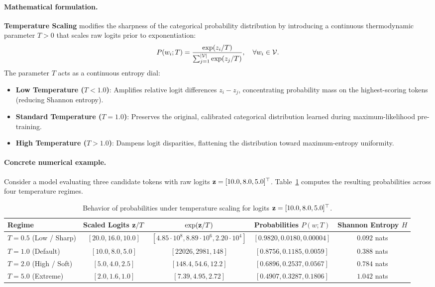 \documentclass[../../main.tex]{subfiles}
\begin{document}
\paragraph{Mathematical formulation.}
\textbf{Temperature Scaling} modifies the sharpness of the categorical probability distribution by introducing a continuous thermodynamic parameter $T > 0$ that scales raw logits prior to exponentiation:
\begin{equation}
\label{eq:temperature_softmax}
P(w_i; T) = \frac{\exp(z_i / T)}{\sum_{j=1}^{|\mathcal{V}|} \exp(z_j / T)}, \quad \forall w_i \in \mathcal{V}.
\end{equation}
The parameter $T$ acts as a continuous entropy dial:
\begin{itemize}
    \item \textbf{Low Temperature ($T < 1.0$)}: Amplifies relative logit differences $z_i - z_j$, concentrating probability mass on the highest-scoring tokens (reducing Shannon entropy).
    \item \textbf{Standard Temperature ($T = 1.0$)}: Preserves the original, calibrated categorical distribution learned during maximum-likelihood pre-training.
    \item \textbf{High Temperature ($T > 1.0$)}: Dampens logit disparities, flattening the distribution toward maximum-entropy uniformity.
\end{itemize}

\paragraph{Concrete numerical example.}
Consider a model evaluating three candidate tokens with raw logits $\mathbf{z} = [10.0, 8.0, 5.0]^\top$. Table~\ref{tab:temperature_scaling_worked} computes the resulting probabilities across four temperature regimes.

\begin{table}[htbp]
\centering
\small
\caption{Behavior of probabilities under temperature scaling for logits $\mathbf{z} = [10.0, 8.0, 5.0]^\top$.}
\label{tab:temperature_scaling_worked}
\begin{tabular}{lcccc}
\toprule
\textbf{Regime} & \textbf{Scaled Logits $\mathbf{z} / T$} & $\exp(\mathbf{z} / T)$ & \textbf{Probabilities $P(w; T)$} & \textbf{Shannon Entropy $H$} \\
\midrule
$T = 0.5$ (Low / Sharp) & $[20.0, 16.0, 10.0]$ & $[4.85 \cdot 10^8, 8.89 \cdot 10^6, 2.20 \cdot 10^4]$ & $[\mathbf{0.9820}, 0.0180, 0.00004]$ & $0.092$ nats \\
$T = 1.0$ (Default) & $[10.0, 8.0, 5.0]$ & $[22026, 2981, 148]$ & $[\mathbf{0.8756}, 0.1185, 0.0059]$ & $0.388$ nats \\
$T = 2.0$ (High / Soft) & $[5.0, 4.0, 2.5]$ & $[148.4, 54.6, 12.2]$ & $[\mathbf{0.6896}, 0.2537, 0.0567]$ & $0.784$ nats \\
$T = 5.0$ (Extreme) & $[2.0, 1.6, 1.0]$ & $[7.39, 4.95, 2.72]$ & $[\mathbf{0.4907}, 0.3287, 0.1806]$ & $1.042$ nats \\
\bottomrule
\end{tabular}
\end{table}
\end{document}
